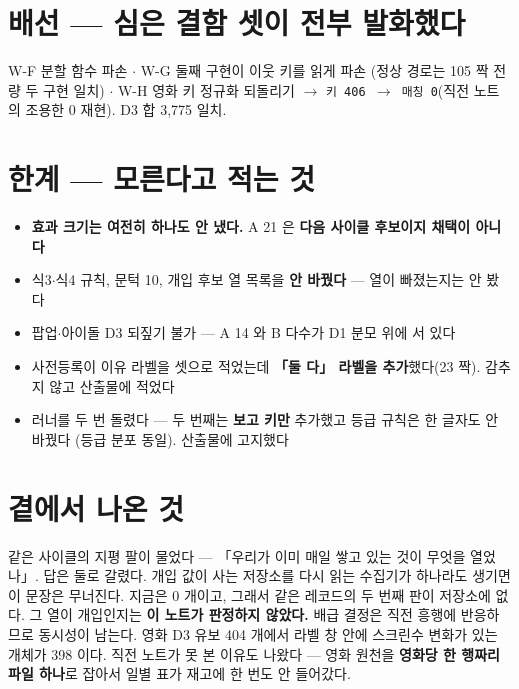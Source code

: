 \documentclass{article}
\begin{document}
\section{배선 --- 심은 결함 셋이 전부 발화했다}

W-F 분할 함수 파손 $\cdot$ W-G 둘째 구현이 이웃 키를 읽게 파손
(정상 경로는 105 짝 전량 두 구현 일치) $\cdot$
W-H 영화 키 정규화 되돌리기 $\to$ \texttt{키 406 $\to$ 매칭 0}(직전 노트의 조용한 0 재현).
D3 합 3{,}775 일치.

\section{한계 --- 모른다고 적는 것}

\begin{itemize}
\item \textbf{효과 크기는 여전히 하나도 안 냈다.} A 21 은 \textbf{다음 사이클 후보이지 채택이 아니다}
\item 식3$\cdot$식4 규칙, 문턱 10, 개입 후보 열 목록을 \textbf{안 바꿨다} --- 열이 빠졌는지는 안 봤다
\item 팝업$\cdot$아이돌 D3 되짚기 불가 --- A 14 와 B 다수가 D1 분모 위에 서 있다
\item 사전등록이 이유 라벨을 셋으로 적었는데 \textbf{「둘 다」 라벨을 추가}했다(23 짝).
      감추지 않고 산출물에 적었다
\item 러너를 두 번 돌렸다 --- 두 번째는 \textbf{보고 키만} 추가했고 등급 규칙은 한 글자도 안 바꿨다
      (등급 분포 동일). 산출물에 고지했다
\end{itemize}

\section{곁에서 나온 것}

같은 사이클의 지평 팔이 물었다 --- 「우리가 이미 매일 쌓고 있는 것이 무엇을 열었나」.
답은 둘로 갈렸다.
{개입 값이 사는 저장소를 다시 읽는 수집기가 하나라도 생기면 이 문장은 무너진다.
지금은 0 개이고, 그래서 같은 레코드의 두 번째 판이 저장소에 없다.}
{그 열이 개입인지는 \textbf{이 노트가 판정하지 않았다.} 배급 결정은 직전 흥행에 반응하므로
동시성이 남는다.}
영화 D3 유보 404 개에서 라벨 창 안에 스크린수 변화가 있는 개체가 398 이다.
직전 노트가 못 본 이유도 나왔다 --- 영화 원천을 \textbf{영화당 한 행짜리 파일 하나}로 잡아서
일별 표가 재고에 한 번도 안 들어갔다.
\end{document}
